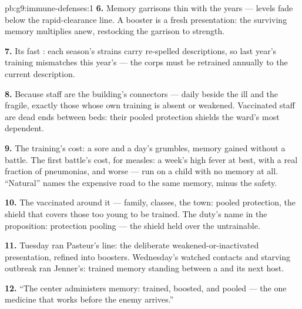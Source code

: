 \begin{solution}{pb:g9:immune-defenses:1}
\textbf{6.} Memory garrisons thin with the years ---
levels fade below the rapid-clearance line. A booster is
a fresh presentation: the surviving memory multiplies
anew, restocking the garrison to strength.

\textbf{7.} Its fast : each season's strains
carry re-spelled descriptions, so last year's training
mismatches this year's  --- the corps must be
retrained annually to the current description.

\textbf{8.} Because staff are the building's connectors
--- daily beside the ill and the fragile, exactly those
whose own training is absent or weakened. Vaccinated
staff are dead ends between beds: their pooled
protection shields the ward's most dependent.

\textbf{9.} The training's cost: a sore  and a day's
grumbles, memory gained without a battle. The first
battle's cost, for measles: a week's high fever at best,
with a real fraction of pneumonias, and worse --- run on
a child with no memory at all. ``Natural'' names the
expensive road to the same memory, minus the safety.

\textbf{10.} The vaccinated around it --- family,
classes, the town: pooled protection, the shield that
covers those too young to be trained. The duty's name in
the proposition: protection pooling --- the shield held
over the untrainable.

\textbf{11.} Tuesday ran Pasteur's line: the deliberate
weakened-or-inactivated presentation, refined into
boosters. Wednesday's watched contacts and starving
outbreak ran Jenner's: trained memory standing between
a  and its next host.

\textbf{12.} ``The center administers memory: trained,
boosted, and pooled --- the one medicine that works
before the enemy arrives.''
\end{solution}
